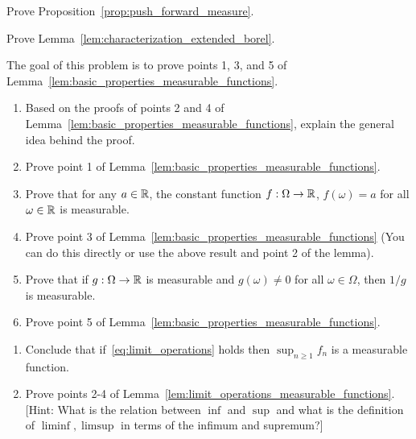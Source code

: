 \begin{problem}\label{prb:push_forward_measure}
Prove Proposition~\ref{prop:push_forward_measure}.
\end{problem}

\begin{problem}\label{prb:characterization_extended_borel}
Prove Lemma~\ref{lem:characterization_extended_borel}.
\end{problem}

\begin{problem}\label{prb:basic_properties_measurable_functions}
The goal of this problem is to prove points 1, 3, and 5 of Lemma~\ref{lem:basic_properties_measurable_functions}.
\begin{enumerate}[label=(\alph*)]
\item Based on the proofs of points 2 and 4 of Lemma~\ref{lem:basic_properties_measurable_functions}, explain the general idea behind the proof.
\item Prove point 1 of Lemma~\ref{lem:basic_properties_measurable_functions}.
\item Prove that for any $a \in \mathbb R$, the constant function $f : \Omega \to \mathbb R$, $f(\omega) = a$ for all $\omega \in \mathbb R$ is measurable.
\item Prove point 3 of Lemma~\ref{lem:basic_properties_measurable_functions} (You can do this directly or use the above result and point 2 of the lemma).
\item Prove that if $g : \Omega \to \mathbb R$ is measurable and $g(\omega) \ne 0$ for all $\omega \in \Omega$, then $1/g$ is measurable.
\item Prove point 5 of Lemma~\ref{lem:basic_properties_measurable_functions}.
\end{enumerate}
\end{problem}

\begin{problem}\label{prb:limit_operations_measurable_functions}
\hfil
\begin{enumerate}[label=(\alph*)]
\item Conclude that if~\eqref{eq:limit_operations} holds then $\sup_{n \ge 1} f_n$ is a measurable function.
\item Prove points 2-4 of Lemma~\ref{lem:limit_operations_measurable_functions}. [Hint: What is the relation between $\inf$ and $\sup$ and what is the definition of $\liminf, \limsup$ in terms of the infimum and supremum?]
\end{enumerate}
\end{problem}

